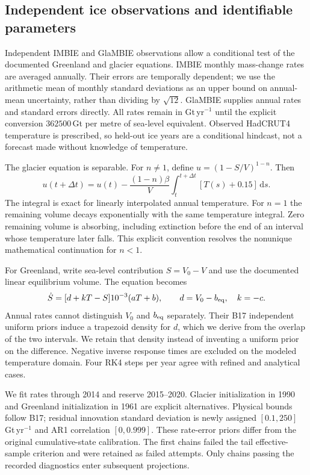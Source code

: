 \subsection{Independent ice observations and identifiable parameters}
Independent IMBIE and GlaMBIE observations allow a conditional test of the
documented Greenland and glacier equations\cite{imbie,glambie}. IMBIE monthly
mass-change rates are averaged annually. Their errors are temporally dependent;
we use the arithmetic mean of monthly standard deviations as an upper bound on
annual-mean uncertainty, rather than dividing by $\sqrt{12}$. GlaMBIE supplies
annual rates and standard errors directly. All rates remain in Gt\,yr$^{-1}$
until the explicit conversion $362500$\,Gt per metre of sea-level equivalent.
Observed HadCRUT4 temperature is prescribed, so held-out ice years are a
conditional hindcast, not a forecast made without knowledge of temperature.

The glacier equation is separable. For $n\ne1$, define
$u=(1-S/V)^{1-n}$. Then
\begin{equation}
 u(t+\Delta t)=u(t)-\frac{(1-n)\beta}{V}
 \int_t^{t+\Delta t}[T(s)+0.15]\,\mathrm ds.
\end{equation}
The integral is exact for linearly interpolated annual temperature. For $n=1$
the remaining volume decays exponentially with the same temperature integral.
Zero remaining volume is absorbing, including extinction before the end of an
interval whose temperature later falls. This explicit convention resolves the
nonunique mathematical continuation for $n<1$.

For Greenland, write sea-level contribution $S=V_0-V$ and use the documented
linear equilibrium volume. The equation becomes
\begin{equation}
 \dot S=[d+kT-S]10^{-3}(aT+b),\qquad d=V_0-b_{\rm eq},\quad k=-c.
\end{equation}
Annual rates cannot distinguish $V_0$ and $b_{\rm eq}$ separately. Their B17
independent uniform priors induce a trapezoid density for $d$, which we derive
from the overlap of the two intervals. We retain that density instead of
inventing a uniform prior on the difference. Negative inverse response times
are excluded on the modeled temperature domain. Four RK4 steps per year agree
with refined and analytical cases.

We fit rates through 2014 and reserve 2015--2020. Glacier initialization in
1990 and Greenland initialization in 1961 are explicit alternatives. Physical
bounds follow B17; residual innovation standard deviation is newly assigned
$[0.1,250]$\,Gt\,yr$^{-1}$ and AR1 correlation $[0,0.999]$. These rate-error
priors differ from the original cumulative-state calibration. The first chains
failed the tail effective-sample criterion and were retained as failed attempts.
Only chains passing the recorded diagnostics enter subsequent projections.

